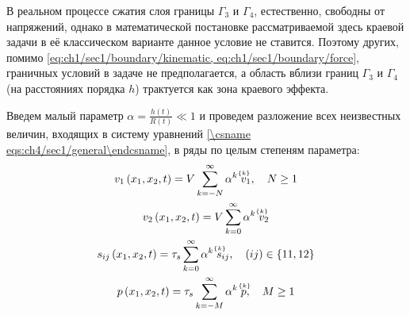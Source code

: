 В реальном процессе сжатия слоя границы $\Gamma_{3}$ и $\Gamma_{4}$, естественно, свободны от напряжений, однако в математической постановке рассматриваемой здесь краевой задачи в её классическом варианте данное условие не ставится. Поэтому других, помимо \cref{eq:ch1/sec1/boundary/kinematic, eq:ch1/sec1/boundary/force}, граничных условий в задаче не предполагается, а область вблизи границ $\Gamma_{3}$ и $\Gamma_{4}$ (на расстояниях порядка $h$) трактуется как зона краевого эффекта.

Введем малый параметр $\alpha = \frac{h(t)}{R(t)} \ll 1$ и проведем разложение всех неизвестных величин, входящих в систему уравнений \cref{\csname eqs:ch4/sec1/general\endcsname}, в ряды по целым степеням параметра:
\begin{gather}
  \label{eqs:ch4/series/v1}
  v_{1}\left(x_1, x_2, t\right) = V \sum_{k=-N}^{\infty}{\alpha^{k} \; \uindex{v}{k}_{1}}, \quad N \ge 1
  \\
  \label{eqs:ch4/series/v2}
  v_{2}\left(x_1, x_2, t\right) = V \sum_{k=0}^{\infty}{\alpha^{k} \; \uindex{v}{k}_{2}}
  \\
  \label{eqs:ch4/series/sij}
  s_{ij}\left(x_1, x_2, t\right) = \tau_{s} \sum_{k=0}^{\infty}{\alpha^{k} \; \uindex{s}{k}_{ij}}, \quad (ij)\in\{11, 12\}
  \\
  \label{eqs:ch4/series/p}
  p\left(x_1, x_2, t\right) = \tau_{s} \sum_{k=-M}^{\infty}{\alpha^{k} \; \uindex{p}{k}}, \quad M \ge 1
\end{gather}

